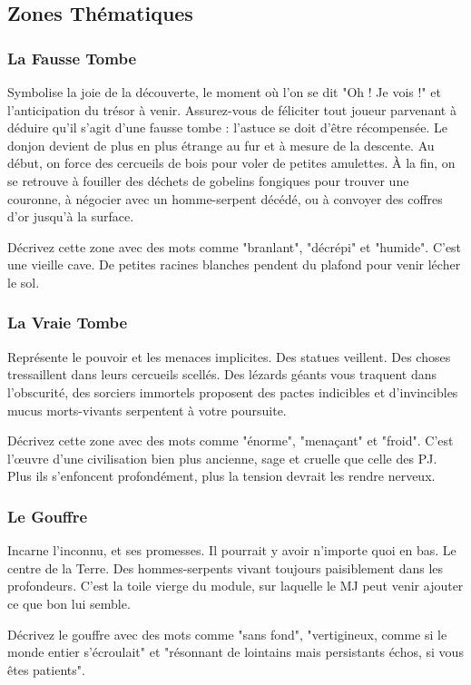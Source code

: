\subsection{Zones Thématiques}
\subsubsection{La Fausse Tombe}
Symbolise la joie de la découverte, le moment où l'on se dit "Oh ! Je vois !" et l'anticipation du trésor à venir.
Assurez-vous de féliciter tout joueur parvenant à déduire qu'il s'agit d'une fausse tombe : l'astuce se doit d'être récompensée. 
Le donjon devient de plus en plus étrange au fur et à mesure de la descente. 
Au début, on force des cercueils de bois pour voler de petites amulettes. 
À la fin, on se retrouve à fouiller des déchets de gobelins fongiques pour trouver une couronne, à négocier avec un homme-serpent décédé, ou à convoyer des coffres d'or jusqu'à la surface.

Décrivez cette zone avec des mots comme "branlant", "décrépi" et "humide".
C'est une vieille cave. 
De petites racines blanches pendent du plafond pour venir lécher le sol. 

\subsubsection{La Vraie Tombe}
Représente le pouvoir et les menaces implicites. 
Des statues veillent. 
Des choses tressaillent dans leurs cercueils scellés. 
Des lézards géants vous traquent dans l'obscurité, des sorciers immortels proposent des pactes indicibles et d'invincibles mucus morts-vivants serpentent à votre poursuite.

Décrivez cette zone avec des mots comme "énorme", "menaçant" et "froid". 
C'est l'\oe uvre d'une civilisation bien plus ancienne, sage et cruelle que celle des PJ. 
Plus ils s'enfoncent profondément, plus la tension devrait les rendre nerveux.

\subsubsection{Le Gouffre}
Incarne l'inconnu, et ses promesses.
Il pourrait y avoir n'importe quoi en bas. 
Le centre de la Terre. 
Des hommes-serpents vivant toujours paisiblement dans les profondeurs. 
C'est la toile vierge du module, sur laquelle le MJ peut venir ajouter ce que bon lui semble.

Décrivez le gouffre avec des mots comme "sans fond", "vertigineux, comme si le monde entier s'écroulait" et "résonnant
de lointains mais persistants échos, si vous êtes patients".

